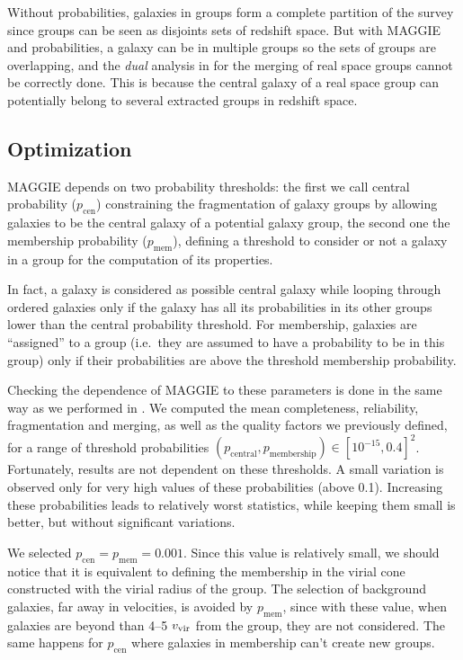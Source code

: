 Without probabilities, galaxies in groups form a complete partition of the
survey since groups can be seen as disjoints sets of redshift space. But with
MAGGIE and probabilities, a galaxy can be in multiple groups so the sets of
groups are overlapping, and the \emph{dual} analysis in \citet{Duarte+14} for
the merging of real space groups cannot be correctly done. This is because the
central galaxy of a real space group can potentially belong to several
extracted groups in redshift space.

\subsection{Optimization}

MAGGIE depends on two probability thresholds: the first we call central
probability ($p_\mathrm{cen}$) constraining the fragmentation of galaxy groups
by allowing galaxies to be the central galaxy of a potential galaxy group, the
second one the membership probability ($p_\mathrm{mem}$), defining a threshold
to consider or not a galaxy in a group for the computation of its properties.

In fact, a galaxy is considered as possible central galaxy while looping
through ordered galaxies only if the galaxy has all its probabilities in its
other groups lower than the central probability threshold. For membership,
galaxies are ``assigned'' to a group (i.e.\ they are assumed to have a
probability to be in this group) only if their probabilities are above the
threshold membership probability.

Checking the dependence of MAGGIE to these parameters is done in the same way
as we performed in . We computed
the mean completeness, reliability, fragmentation and merging, as well as the
quality factors we previously defined, for a range of threshold probabilities
$(p_\mathrm{central}, p_\mathrm{membership})\in{\left[10^{-15}, 0.4\right]}^2$.
Fortunately, results are not dependent on these thresholds. A small variation
is observed only for very high values of these probabilities (above 0.1).
Increasing these probabilities leads to relatively worst statistics, while
keeping them small is better, but without significant variations.

We selected $p_\mathrm{cen}=p_\mathrm{mem}=0.001$. Since this value is
relatively small, we should notice that it is equivalent to defining the
membership in the virial cone constructed with the virial radius of the group.
The selection of background galaxies, far away in velocities, is avoided by
$p_\mathrm{mem}$, since with these value, when galaxies are beyond than
4--5 $v_{\rm vir}$ from the group, they are not considered. The same happens
for $p_\mathrm{cen}$ where galaxies in membership can't create new groups.

